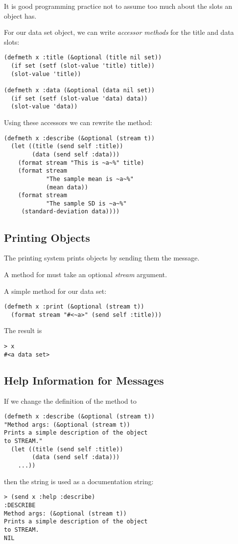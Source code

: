 \begin{slide}{}
It is good programming practice not to assume too much about the slots
an object has.

For our data set object, we can write {\em accessor methods}\/ for the
title and data slots:
{\Large
\begin{verbatim}
(defmeth x :title (&optional (title nil set))
  (if set (setf (slot-value 'title) title))
  (slot-value 'title))

(defmeth x :data (&optional (data nil set))
  (if set (setf (slot-value 'data) data))
  (slot-value 'data))
\end{verbatim}}
Using these accessors we can rewrite the  method:
{\Large
\begin{verbatim}
(defmeth x :describe (&optional (stream t))
  (let ((title (send self :title))
        (data (send self :data)))
    (format stream "This is ~a~%" title)
    (format stream
            "The sample mean is ~a~%"
            (mean data))
    (format stream
            "The sample SD is ~a~%"
     (standard-deviation data))))
\end{verbatim}}
\end{slide}

\begin{slide}{}
\subsection{Printing Objects}
The printing system prints objects by sending them the 
message.

A method for  must take an optional {\em stream}\/ argument.

A simple  method for our data set:
{\Large
\begin{verbatim}
(defmeth x :print (&optional (stream t))
  (format stream "#<~a>" (send self :title)))
\end{verbatim}}
The result is
{\Large
\begin{verbatim}
> x
#<a data set>
\end{verbatim}}
\end{slide}

\begin{slide}{}
\subsection{Help Information for Messages}
If we change the definition of the  method to
{\Large
\begin{verbatim}
(defmeth x :describe (&optional (stream t))
"Method args: (&optional (stream t))
Prints a simple description of the object
to STREAM."
  (let ((title (send self :title))
        (data (send self :data)))
    ...))
\end{verbatim}}
then the string is used as a documentation string: {\Large
\begin{verbatim}
> (send x :help :describe)
:DESCRIBE
Method args: (&optional (stream t))
Prints a simple description of the object
to STREAM.
NIL
\end{verbatim}}
\end{slide}

